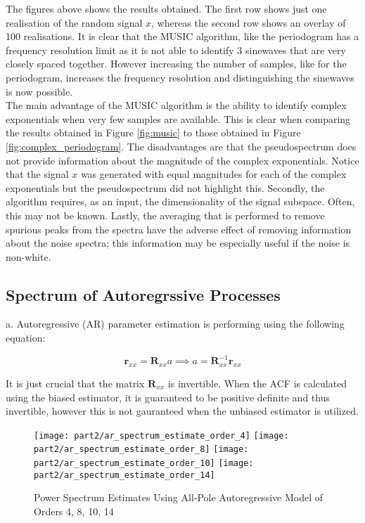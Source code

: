 \noindent{}The figures above shows the results obtained. The first row shows just one realisation of the random signal $x$, whereas the second row shows an overlay of 100 realisations. It is clear that the MUSIC algorithm, like the periodogram has a frequency resolution limit as it is not able to identify 3 sinewaves that are very closely spaced together. However increasing the number of samples, like for the periodogram, increases the frequency resolution and distinguishing the sinewaves is now possible.\\

\noindent{}The main advantage of the MUSIC algorithm is the ability to identify complex exponentials when very few samples are available. This is clear when comparing the results obtained in Figure \ref{fig:music} to those obtained in Figure \ref{fig:complex_periodogram}. The disadvantages are that the pseudospectrum does not provide information about the magnitude of the complex exponentials. Notice that the signal $x$ was generated with equal magnitudes for each of the complex exponentials but the pseudospectrum did not highlight this. Secondly, the algorithm requires, as an input, the dimensionality of the signal subspace. Often, this may not be known. Lastly, the averaging that is performed to remove spurious peaks from the spectra have the adverse effect of removing information about the noise spectra; this information may be especially useful if the noise is non-white.


\subsection{Spectrum of Autoregrssive Processes}

\noindent{}a. Autoregressive (AR) parameter estimation is performing using the following equation:

\begin{equation*}
\textbf{r}_{xx} = \textbf{R}_{xx}a \implies a = \textbf{R}_{xx}^{-1}\textbf{r}_{xx}
\end{equation*}

\noindent{}It is just crucial that the matrix $\textbf{R}_{xx}$ is invertible. When the ACF is calculated using the biased estimator, it is guaranteed to be positive definite and thus invertible, however this is not gauranteed when the unbiased estimator is utilized.

\begin{figure}[H]
\centering{}
\texttt{[image: part2/ar\_spectrum\_estimate\_order\_4]}
\texttt{[image: part2/ar\_spectrum\_estimate\_order\_8]}
\texttt{[image: part2/ar\_spectrum\_estimate\_order\_10]}
\texttt{[image: part2/ar\_spectrum\_estimate\_order\_14]}
\caption{Power Spectrum Estimates Using All-Pole Autoregressive Model of Orders 4, 8, 10, 14}
\label{fig:AR_1000}
\end{figure}

